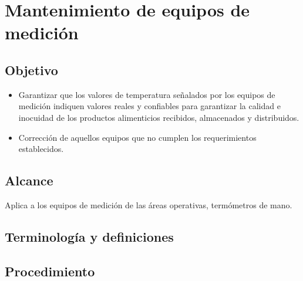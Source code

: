\thispagestyle{formato-PI}
\renewcommand{\MayorVer}{2}
\renewcommand{\MenorVer}{0}
\renewcommand{\Titulo}{Mantenimiento de equipos de medición}
\renewcommand{\TipoID}{PRO}
\renewcommand{\FechaPub}{2023--01}

\section{\Titulo}
\renewcommand{\Codigo}{\Prog--\thesection--\TipoID}

\subsection{Objetivo}

\begin{itemize}
	\item Garantizar que los valores de temperatura señalados por los equipos de medición indiquen valores reales y confiables para garantizar la calidad e inocuidad de los productos alimenticios recibidos, almacenados y distribuidos.
	\item Corrección de aquellos equipos que no cumplen los requerimientos establecidos.
\end{itemize}

\subsection{Alcance}
Aplica a los equipos de medición de las áreas operativas, termómetros de mano.

\subsection{Terminología y definiciones}
\begin{description}
\end{description}

\subsection{Procedimiento}
